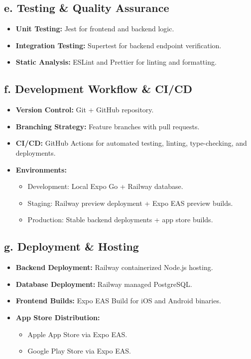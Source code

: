 \documentclass{article}
\begin{document}
\subsection*{e. Testing \& Quality Assurance}
\begin{itemize}
    \item \textbf{Unit Testing:} Jest for frontend and backend logic.
    \item \textbf{Integration Testing:} Supertest for backend endpoint verification.
    \item \textbf{Static Analysis:} ESLint and Prettier for linting and formatting.
\end{itemize}

\subsection*{f. Development Workflow \& CI/CD}
\begin{itemize}
    \item \textbf{Version Control:} Git + GitHub repository.
    \item \textbf{Branching Strategy:} Feature branches with pull requests.
    \item \textbf{CI/CD:} GitHub Actions for automated testing, linting, type-checking, and deployments.
    \item \textbf{Environments:}
    \begin{itemize}
        \item Development: Local Expo Go + Railway database.
        \item Staging: Railway preview deployment + Expo EAS preview builds.
        \item Production: Stable backend deployments + app store builds.
    \end{itemize}
\end{itemize}

\subsection*{g. Deployment \& Hosting}
\begin{itemize}
    \item \textbf{Backend Deployment:} Railway containerized Node.js hosting.
    \item \textbf{Database Deployment:} Railway managed PostgreSQL.
    \item \textbf{Frontend Builds:} Expo EAS Build for iOS and Android binaries.
    \item \textbf{App Store Distribution:}
    \begin{itemize}
        \item Apple App Store via Expo EAS.
        \item Google Play Store via Expo EAS.
    \end{itemize}
\end{itemize}
\end{document}
